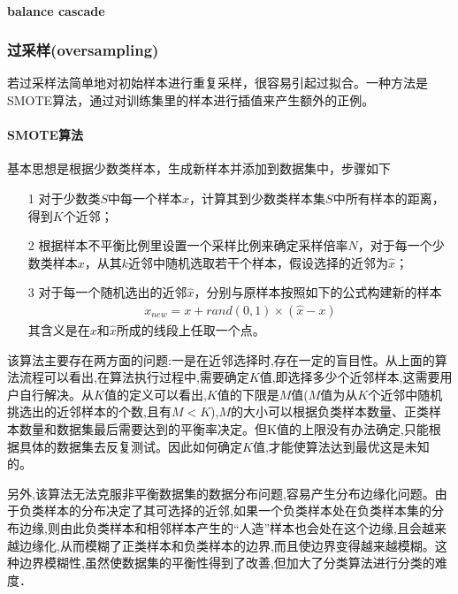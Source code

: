 \paragraph{balance cascade}

\subsubsection{过采样(oversampling)}
若过采样法简单地对初始样本进行重复采样，很容易引起过拟合。一种方法是SMOTE算法，通过对训练集里的样本进行插值来产生额外的正例。
\paragraph{SMOTE算法}基本思想是根据少数类样本，生成新样本并添加到数据集中，步骤如下
\begin{itemize}
\item[1] 对于少数类$S$中每一个样本$x$，计算其到少数类样本集$S$中所有样本的距离，得到$K$个近邻；
\item[2] 根据样本不平衡比例里设置一个采样比例来确定采样倍率$N$，对于每一个少数类样本$x$，从其$k$近邻中随机选取若干个样本，假设选择的近邻为$\hat{x}$；
\item[3] 对于每一个随机选出的近邻$\hat{x}$，分别与原样本按照如下的公式构建新的样本
\begin{eqnarray}
x_{new}=x + rand(0,1)\times(\hat{x}-x)
\end{eqnarray}
其含义是在$x$和$\hat{x}$所成的线段上任取一个点。
\end{itemize}

该算法主要存在两方面的问题:一是在近邻选择时,存在一定的盲目性。从上面的算法流程可以看出,在算法执行过程中,需要确定$K$值,即选择多少个近邻样本,这需要用户自行解决。从$K$值的定义可以看出,$K$值的下限是$M$值($M$值为从$K$个近邻中随机挑选出的近邻样本的个数,且有$M < K$),$M$的大小可以根据负类样本数量、正类样本数量和数据集最后需要达到的平衡率决定。但K值的上限没有办法确定,只能根据具体的数据集去反复测试。因此如何确定$K$值,才能使算法达到最优这是未知的。 

另外,该算法无法克服非平衡数据集的数据分布问题,容易产生分布边缘化问题。由于负类样本的分布决定了其可选择的近邻,如果一个负类样本处在负类样本集的分布边缘,则由此负类样本和相邻样本产生的“人造”样本也会处在这个边缘,且会越来越边缘化,从而模糊了正类样本和负类样本的边界,而且使边界变得越来越模糊。这种边界模糊性,虽然使数据集的平衡性得到了改善,但加大了分类算法进行分类的难度．

